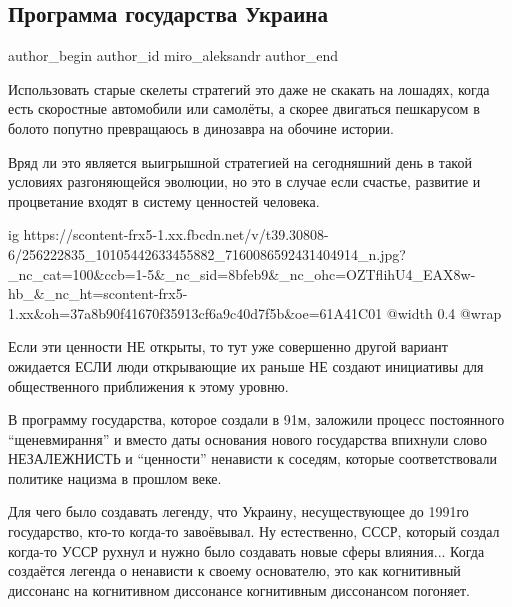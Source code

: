  
 
 
 
 
 
\subsection{Программа государства Украина}
\label{sec:22_11_2021.fb.miro_aleksandr.1.programma_gosudarstvo}
 
\ifcmt
 author_begin
   author_id miro_aleksandr
 author_end
\fi

Использовать старые скелеты стратегий это даже не скакать на лошадях, когда
есть скоростные автомобили или самолёты, а скорее двигаться пешкарусом в болото
попутно превращаюсь в динозавра на обочине истории.

Вряд ли это является выигрышной стратегией на сегодняшний день в такой условиях
разгоняющейся эволюции, но это в случае если счастье, развитие и процветание
входят в систему ценностей человека. 

\ifcmt
  ig https://scontent-frx5-1.xx.fbcdn.net/v/t39.30808-6/256222835_10105442633455882_7160086592431404914_n.jpg?_nc_cat=100&ccb=1-5&_nc_sid=8bfeb9&_nc_ohc=OZTflihU4_EAX8w-hb_&_nc_ht=scontent-frx5-1.xx&oh=37a8b90f41670f35913cf6a9c40d7f5b&oe=61A41C01
  @width 0.4
  @wrap 
\fi

Если эти ценности НЕ открыты, то тут уже совершенно другой вариант ожидается
ЕСЛИ люди открывающие их раньше НЕ создают инициативы для общественного
приближения к этому уровню.

В программу государства, которое создали в 91м, заложили процесс постоянного
\enquote{щеневмирання} и вместо даты основания нового государства впихнули слово
НЕЗАЛЕЖНИСТЬ и \enquote{ценности} ненависти к соседям, которые соответствовали политике
нацизма в прошлом веке.

Для чего было создавать легенду, что Украину, несуществующее до 1991го
государство, кто-то когда-то завоёвывал. Ну естественно, СССР, который создал
когда-то УССР рухнул и нужно было создавать новые сферы влияния... Когда
создаётся легенда о ненависти к своему основателю, это как когнитивный
диссонанс на когнитивном диссонансе когнитивным диссонансом погоняет.

